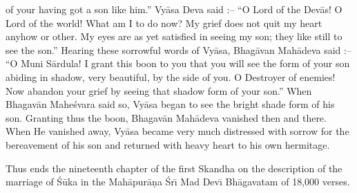 of your having got a son like him.'' Vy\=asa Deva said :-- ``O Lord of the Dev\=as! O Lord of the world! What am I to do now? My grief does not quit my heart anyhow or other. My eyes are as yet satisfied in seeing my son; they like still to see the son.'' Hearing these sorrowful words of Vy\=asa, Bhag\=avan Mah\=adeva said :-- ``O Muni S\=ardula! I grant this boon to you that you will see the form of your son abiding in shadow, very beautiful, by the side of you. O Destroyer of enemies! Now abandon your grief by seeing that shadow form of your son.'' When Bhagav\=an Mahe\'svara said so, Vy\=asa began to see the bright shade form of his son. Granting thus the boon, Bhagav\=an Mah\=adeva vanished then and there. When He vanished away, Vy\=asa became very much distressed with sorrow for the bereavement of his son and returned with heavy heart to his own hermitage.

Thus ends the nineteenth chapter of the first Skandha on the description of the marriage of \'S\=uka in the Mah\=apur\=a\d{n}a \'Sr\={\i} Mad Dev\={\i} Bh\=agavatam of 18,000 verses.



